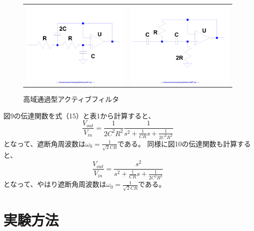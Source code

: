 \documentclass[10pt,a4j,dvipdfmx]{jsarticle}
\makeatletter
\let\@oldsec\section
\renewcommand{\section}[1]{\@oldsec{#1}\vspace{-5pt}{\color{TealBlue}\hrule height 0.6pt \hfill}\par}
\makeatother
\begin{document}
\begin{figure}[H]
    \begin{tabular}{cc}
      \begin{minipage}[t]{0.45\hsize}
        \centering
        \includegraphics[width=6cm, angle=270]{ActiveLPF.pdf}
        \caption{低域通過型アクティブフィルタ}
      \end{minipage} &
      \begin{minipage}[t]{0.45\hsize}
        \centering
        \includegraphics[width = 6cm, angle=270]{ActiveHPF.pdf}
        \caption{高域通過型アクティブフィルタ}
      \end{minipage}
    \end{tabular}
  \end{figure}
図9の伝達関数を式（15）と表1から計算すると、
\begin{equation}
\frac{V_{out}}{V_{in}} = \frac{1}{2C^2 R^2} \frac{1}{s^2 + \frac{1}{CR}s+\frac{1}{2C^2 R^2}}
\end{equation}
となって、遮断角周波数は$\omega_0 = \frac{1}{\sqrt{2}CR}$である。
同様に図10の伝達関数も計算すると、
\begin{equation}
\frac{V_{out}}{V_{in}} = \frac{s^2}{s^2 + \frac{1}{CR}s+\frac{1}{2C^2 R^2}}
\end{equation}
となって、やはり遮断角周波数は$\omega_0 = \frac{1}{\sqrt{2}CR}$である。

\section{実験方法}
\end{document}
